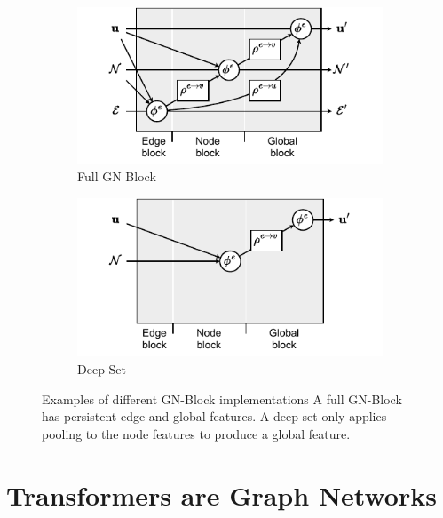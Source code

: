 \begin{figure}
    \centering
    \begin{subfigure}[b]{0.49\textwidth}
        \centering
        \includegraphics[width=\textwidth]{Figures/transformers/full_gn.pdf}
        \caption{Full GN Block}
        \label{fig:full_gn_block}
    \end{subfigure}
    \begin{subfigure}[b]{0.49\textwidth}
        \centering
        \includegraphics[width=\textwidth]{Figures/transformers/deepset.pdf}
        \caption{Deep Set}
        \label{fig:deep_set}
    \end{subfigure}
    \caption{Examples of different GN-Block implementations  A full GN-Block has persistent edge and global features.  A deep set only applies pooling to the node features to produce a global feature.}
\end{figure}

\section{Transformers are Graph Networks}

